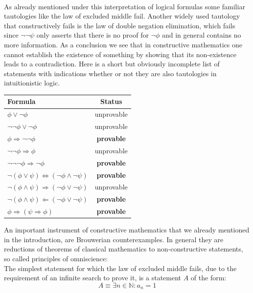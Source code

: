 \documentclass[11pt,a4paper,leqno]{report}
\numberwithin{equation}{chapter}
\begin{document}
\\
As already mentioned under this interpretation of logical formulas some familiar tautologies like the law of excluded middle fail. Another widely used tautology that constructively fails is the law of double negation elimination, which fails since $\neg\neg\psi$ only asserts that there is no proof for $\neg\phi$ and in general contains no more information\cite{Dal}. As a conclusion we see that in constructive mathematics one cannot establish the existence of something by showing that its non-existence leads to a contradiction.
Here is a short but obviously incomplete list of statements with indications whether or not they are also tautologies in intuitionistic logic.\\
\begin{center}
\begin{tabular}{|l|c|} \hline\hline
\textbf{Formula} &{\textbf{Status}}\\
\hline
$\phi\vee\neg\phi$ &  unprovable \\
\cline{1-2}
$\neg\neg\phi\vee\neg\phi$ &  unprovable \\
\cline{1-2}
$\phi\Rightarrow\neg\neg\phi$ & \textbf{provable} \\ 
\cline{1-2}
$\neg\neg\phi\Rightarrow\phi$ & unprovable  \\
\cline{1-2}
$\neg\neg\neg\phi\Rightarrow\neg\phi$ & \textbf{provable}  \\
\cline{1-2}
$\neg(\phi\vee\psi)\Leftrightarrow (\neg\phi\wedge\neg\psi)$ & \textbf{provable}\\
\cline{1-2}
$\neg(\phi\wedge\psi)\Rightarrow(\neg\phi\vee\neg\psi)$ & unprovable  \\
\cline{1-2}
$\neg(\phi\wedge\psi)\Leftarrow(\neg\phi\vee\neg\psi)$ & \textbf{provable} \\
\cline{1-2}
$\phi\Rightarrow(\psi\Rightarrow\phi)$ & \textbf{provable} 
\\ \hline\hline
\end{tabular}
\end{center}
An important instrument of constructive mathematics that we already mentioned in the introduction, are Brouwerian counterexamples. In general they are reductions of theorems of classical mathematics to non-constructive statements, so called principles of omniscience: \\The simplest statement for which the law of excluded middle fails, due to the requirement of an infinite search to prove it, is a statement $A$ of the form:
\begin{equation} A\equiv\exists n\in\mathbb{N}:a_n=1\end{equation}
\end{document}
